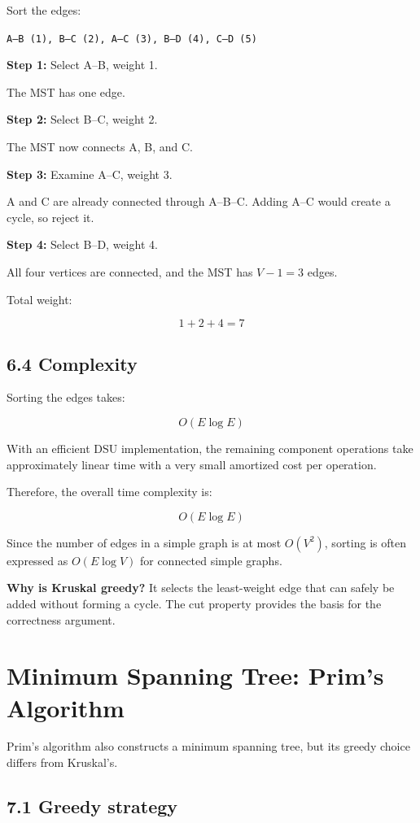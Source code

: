 Sort the edges:

\texttt{A--B (1), B--C (2), A--C (3), B--D (4), C--D (5)}

\textbf{Step 1:} Select A--B, weight 1.

The MST has one edge.

\textbf{Step 2:} Select B--C, weight 2.

The MST now connects A, B, and C.

\textbf{Step 3:} Examine A--C, weight 3.

A and C are already connected through A--B--C. Adding A--C would create a cycle, so reject it.

\textbf{Step 4:} Select B--D, weight 4.

All four vertices are connected, and the MST has $V-1=3$ edges.

Total weight:


\[
1+2+4=\boxed{7}
\]


\subsection{6.4 Complexity}

Sorting the edges takes:


\[
O(E\log E)
\]


With an efficient DSU implementation, the remaining component operations take approximately linear time with a very small amortized cost per operation.

Therefore, the overall time complexity is:


\[
\boxed{O(E\log E)}
\]


Since the number of edges in a simple graph is at most $O(V^2)$, sorting is often expressed as $O(E\log V)$ for connected simple graphs.

\textbf{Why is Kruskal greedy?} It selects the least-weight edge that can safely be added without forming a cycle. The cut property provides the basis for the correctness argument.

\section{Minimum Spanning Tree: Prim's Algorithm}

Prim's algorithm also constructs a minimum spanning tree, but its greedy choice differs from Kruskal's.

\subsection{7.1 Greedy strategy}

